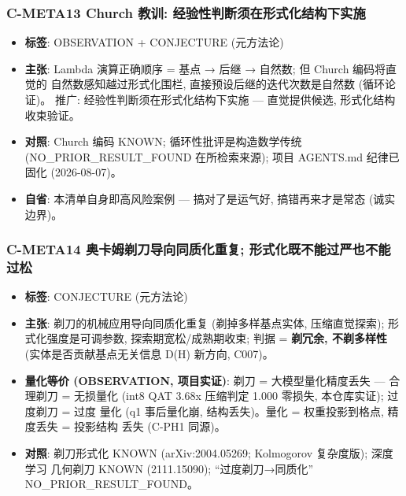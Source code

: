 \documentclass[
]{article}
\providecommand{\tightlist}{%
  \setlength{\itemsep}{0pt}\setlength{\parskip}{0pt}}
\begin{document}
\subsubsection{C-META13 Church 教训:
经验性判断须在形式化结构下实施}\label{c-meta13-church-ux6559ux8bad-ux7ecfux9a8cux6027ux5224ux65adux987bux5728ux5f62ux5f0fux5316ux7ed3ux6784ux4e0bux5b9eux65bd}

\begin{itemize}
\tightlist
\item
  \textbf{标签}: OBSERVATION + CONJECTURE (元方法论)
\item
  \textbf{主张}: Lambda 演算正确顺序 = 基点 → 后继 → 自然数; 但 Church
  编码将直觉的 自然数感知越过形式化围栏, 直接预设后继的迭代次数是自然数
  (循环论证)。 推广: 经验性判断须在形式化结构下实施 --- 直觉提供候选,
  形式化结构收束验证。
\item
  \textbf{对照}: Church 编码 KNOWN; 循环性批评是构造数学传统
  (NO\_PRIOR\_RESULT\_FOUND 在所检索来源); 项目 AGENTS.md 纪律已固化
  (2026-08-07)。
\item
  \textbf{自省}: 本清单自身即高风险案例 --- 搞对了是运气好,
  搞错再来才是常态 (诚实边界)。
\end{itemize}

\subsubsection{C-META14 奥卡姆剃刀导向同质化重复;
形式化既不能过严也不能过松}\label{c-meta14-ux5965ux5361ux59c6ux5243ux5200ux5bfcux5411ux540cux8d28ux5316ux91cdux590d-ux5f62ux5f0fux5316ux65e2ux4e0dux80fdux8fc7ux4e25ux4e5fux4e0dux80fdux8fc7ux677e}

\begin{itemize}
\tightlist
\item
  \textbf{标签}: CONJECTURE (元方法论)
\item
  \textbf{主张}: 剃刀的机械应用导向同质化重复 (剃掉多样基点实体,
  压缩直觉探索); 形式化强度是可调参数, 探索期宽松/成熟期收束; 判据 =
  \textbf{剃冗余, 不剃多样性} (实体是否贡献基点无关信息 D(H) 新方向,
  C007)。
\item
  \textbf{量化等价 (OBSERVATION, 项目实证)}: 剃刀 = 大模型量化精度丢失
  --- 合理剃刀 = 无损量化 (int8 QAT 3.68x 压缩判定 1.000 零损失,
  本仓库实证); 过度剃刀 = 过度 量化 (q1 事后量化崩, 结构丢失)。量化 =
  权重投影到格点, 精度丢失 = 投影结构 丢失 (C-PH1 同源)。
\item
  \textbf{对照}: 剃刀形式化 KNOWN (arXiv:2004.05269; Kolmogorov
  复杂度版); 深度学习 几何剃刀 KNOWN (2111.15090); ``过度剃刀→同质化''
  NO\_PRIOR\_RESULT\_FOUND。
\end{itemize}
\end{document}
